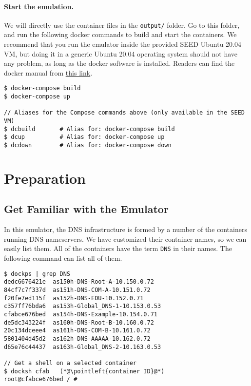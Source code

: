 \paragraph{Start the emulation.}
We will directly use the container files in the \texttt{output/} folder.
Go to this folder, and run the following docker commands
to build and start the containers. We recommend that you run the emulator inside
the provided SEED Ubuntu 20.04 VM, but doing it in a generic Ubuntu 20.04 operating system
should not have any problem, as long as the docker software is installed.
Readers can find the docker manual from
\href{https://github.com/seed-labs/seed-labs/blob/master/manuals/docker/SEEDManual-Container.md}
{\underline{this link}}.

\begin{lstlisting}
$ docker-compose build
$ docker-compose up

// Aliases for the Compose commands above (only available in the SEED VM)
$ dcbuild       # Alias for: docker-compose build
$ dcup          # Alias for: docker-compose up
$ dcdown        # Alias for: docker-compose down
\end{lstlisting}








\section{Preparation}




\subsection{Get Familiar with the Emulator} 

In this emulator, the DNS infrastructure is formed 
by a number of the containers running DNS nameservers. 
We have customized their container names, so we can easily
list them. All of the containers have the term
\texttt{DNS} in their names. The following command 
can list all of them. 

\begin{lstlisting}
$ dockps | grep DNS
dedc6676421e  as150h-DNS-Root-A-10.150.0.72
84cf7c7f337d  as151h-DNS-COM-A-10.151.0.72
f20fe7ed115f  as152h-DNS-EDU-10.152.0.71
c357ff76bda6  as153h-Global_DNS-1-10.153.0.53
cfabce676bed  as154h-DNS-Example-10.154.0.71
de5dc343224f  as160h-DNS-Root-B-10.160.0.72
20c134dceee4  as161h-DNS-COM-B-10.161.0.72
5801404d45d2  as162h-DNS-AAAAA-10.162.0.72
d65e76c44437  as163h-Global_DNS-2-10.163.0.53

// Get a shell on a selected container
$ docksh cfab   (*@\pointleft{container ID}@*) 
root@cfabce676bed / #
\end{lstlisting}


